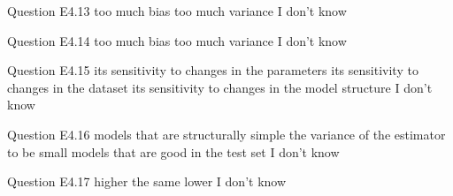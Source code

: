 \begin{frame}{Question E4.13}
	\QuestionNotes{}
	\QuestionAnswers
	{
		\correctanswer too much bias
		\answer too much variance
		\answer I don't know
	}
\end{frame}


\begin{frame}{Question E4.14}
	\QuestionNotes{}
	\QuestionAnswers
	{
		\answer too much bias
		\correctanswer too much variance
		\answer I don't know
	}
\end{frame}


\begin{frame}{Question E4.15}
	\QuestionNotes{}
	\QuestionAnswers
	{
		\answer its sensitivity to changes in the parameters
		\correctanswer its sensitivity to changes in the dataset
		\answer its sensitivity to changes in the model structure
		\answer I don't know
	}
\end{frame}


\begin{frame}{Question E4.16}
	\QuestionNotes{}
	\QuestionAnswers
	{
		\answer models that are structurally simple
		\answer the variance of the estimator to be small
		\correctanswer models that are good in the test set
		\answer I don't know
	}
\end{frame}


\begin{frame}{Question E4.17}
	\QuestionNotes{}
	\QuestionAnswers
	{
		\correctanswer higher
		\answer the same
		\answer lower
		\answer I don't know
	}
\end{frame}



